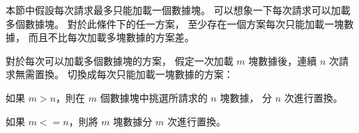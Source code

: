 \startEXERCISE
本節中假設每次請求最多只能加載一個數據塊。
可以想象一下每次請求可以加載多個數據塊。
對於此條件下的任一方案，
至少存在一個方案每次只能加載一塊數據，
而且不比每次加載多塊數據的方案差。
\stopEXERCISE

\startANSWER
對於每次可以加載多個數據塊的方案，
假定一次加載 $m$ 塊數據後，連續 $n$ 次請求無需置換。
切換成每次只能加載一塊數據的方案：

如果 $m>n$，則在 $m$ 個數據塊中挑選所請求的 $n$ 塊數據，
分 $n$ 次進行置換。

如果 $m<=n$，則將 $m$ 塊數據分 $m$ 次進行置換。
\stopANSWER
